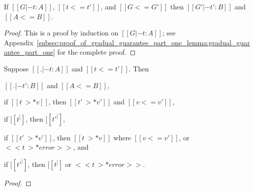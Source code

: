 \begin{lemma}
  \label{lemma:gradual_guarantee_part_one}
  If $[[G |- t : A]]$, $[[t <= t']]$, and $[[G <= G']]$ then $[[G' |- t' : B]]$ and $[[A <= B]]$.
\end{lemma}
\begin{proof}
  This is a proof by induction on $[[G |- t : A]]$; see
  Appendix~\ref{subsec:proof_of_gradual_guarantee_part_one_lemma:gradual_guarantee_part_one}
  for the complete proof.
\end{proof}

\begin{theorem}
  \label{thm:gradual_guarantee}
  Suppose $[[. |- t : A]]$ and $[[t <= t']]$.  Then
  \begin{enumR}
  \item $[[. |- t' : B]]$ and $[[A <= B]]$,
  \item if $[[t ~>* v]]$, then $[[t' ~>* v']]$ and $[[v <= v']]$,
  \item if $[[t ^]]$, then $[[t' ^]]$,
  \item if $[[t' ~>* v']]$, then $[[t ~>* v]]$ where $[[v <= v']]$, or $<<t ~>* error>>$, and
  \item if $[[t' ^]]$, then $[[t ^]]$ or $<<t ~>* error>>$.
  \end{enumR}
\end{theorem}
\begin{proof}
  
\end{proof}


